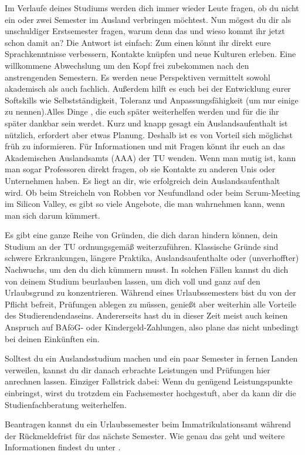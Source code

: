 Im Verlaufe deines Studiums werden dich immer wieder Leute fragen, ob du nicht ein oder zwei Semester im Ausland verbringen möchtest. 
Nun mögest du dir als unschuldiger Erstsemester fragen, warum denn das und wieso kommt ihr jetzt schon damit an? 
Die Antwort ist einfach:
Zum einen könnt ihr direkt eure Sprachkenntnisse verbessern, Kontakte knüpfen und neue Kulturen erleben. Eine willkommene Abwechslung  um den Kopf frei zubekommen nach den anstrengenden Semestern. Es werden neue Perspektiven vermittelt sowohl akademisch als auch fachlich. Außerdem hilft es euch bei der Entwicklung eurer Softskills wie Selbstständigkeit, Toleranz und Anpassungsfähigkeit (um nur einige zu nennen).Alles Dinge , die euch später weiterhelfen werden und für die ihr später dankbar sein werdet.
Kurz und knapp gesagt ein Auslandsaufenthalt ist nützlich, erfordert aber etwas Planung. 
Deshalb ist es von Vorteil sich möglichst früh zu informieren.
Für Informationen und mit Fragen könnt ihr euch an das Akademischen Auslandsamts (AAA) der TU  wenden. 
Wenn man mutig ist, kann man sogar Professoren direkt fragen, ob sie Kontakte zu anderen Unis oder Unternehmen haben. 
Es liegt an dir, wie erfolgreich dein Auslandsaufenthalt wird. 
Ob beim Streicheln von Robben vor Neufundland oder beim Scrum-Meeting im Silicon Valley, es gibt so viele Angebote, die man wahrnehmen kann, wenn man sich darum kümmert.


Es gibt eine ganze Reihe von Gründen, die dich daran hindern können, dein Studium an der TU ordnungsgemäß weiterzuführen.
Klassische Gründe sind schwere Erkrankungen, längere Praktika, Auslandsaufenthalte oder (unverhoffter) Nachwuchs, um den du dich kümmern musst.
In solchen Fällen kannst du dich von deinem Studium beurlauben lassen, um dich voll und ganz auf den Urlaubsgrund zu konzentrieren.
Während eines Urlaubssemesters bist du von der Pflicht befreit, Prüfungen ablegen zu müssen, genießt aber weiterhin alle Vorteile des Studierendendaseins.
Andererseits hast du in dieser Zeit meist auch keinen Anspruch auf BAföG- oder Kindergeld-Zahlungen, also plane das nicht unbedingt bei deinen Einkünften ein.

Solltest du ein Auslandsstudium machen und ein paar Semester in fernen Landen verweilen, kannst du dir danach erbrachte Leistungen und Prüfungen hier anrechnen lassen.
Einziger Fallstrick dabei: Wenn du genügend Leistungspunkte einbringst, wirst du trotzdem ein Fachsemester hochgestuft, aber da kann dir die Studienfachberatung weiterhelfen.

Beantragen kannst du ein Urlaubssemester beim Immatrikulationsamt während der Rückmeldefrist für das nächste Semester.
Wie genau das geht und weitere Informationen findest du unter .
